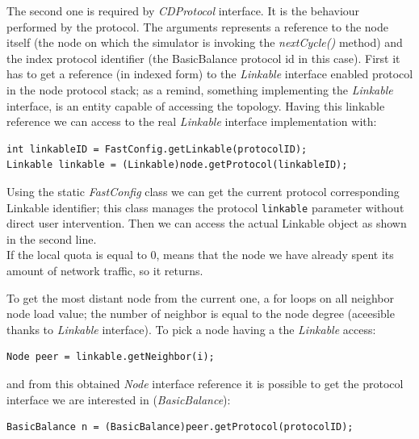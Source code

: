 \documentclass[a4paper,11pt]{article}
\begin{document}
The second one is required by \emph{CDProtocol} interface. It is the
behaviour performed by the protocol. The arguments represents a reference
to the node itself (the node on which the simulator is invoking the
\emph{nextCycle()} method) and the index protocol identifier (the BasicBalance
protocol id in this case). First it has to get a reference (in indexed form) to
the \emph{Linkable} interface enabled protocol in the node protocol
stack; as a remind, something implementing the \emph{Linkable} interface,
is an entity capable of accessing the topology. Having this linkable
reference we can access to the real \emph{Linkable} interface
implementation with: 

\begin{verbatim}
int linkableID = FastConfig.getLinkable(protocolID);
Linkable linkable = (Linkable)node.getProtocol(linkableID);
\end{verbatim}

Using the static \emph{FastConfig} class we can get the current protocol
corresponding Linkable identifier; this class manages the protocol \texttt{linkable} 
parameter without direct user intervention. Then we can access the actual Linkable
object as shown in the second line.\\

If the local quota is equal to 0, means that the node we have already
spent its amount of network traffic, so it returns.

To get the most distant node from the current one, a for loops on
all neighbor node load value; the number of neighbor is equal to the
node degree (aceesible thanks to \emph{Linkable} interface). To pick
a node having a the \emph{Linkable} access:

\begin{verbatim}
Node peer = linkable.getNeighbor(i);
\end{verbatim}


and from this obtained \emph{Node} interface reference it is possible
to get the protocol interface we are interested in (\emph{BasicBalance}):

\begin{verbatim}
BasicBalance n = (BasicBalance)peer.getProtocol(protocolID);
\end{verbatim}
\end{document}
